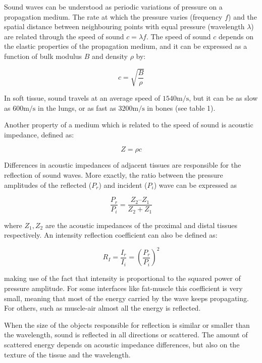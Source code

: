 \documentclass[12pt]{article} %
\begin{document}
	
	Sound waves can be understood as periodic variations of pressure on a propagation medium. The rate at which the pressure varies (frequency $f$) and the spatial distance between neighbouring points with equal pressure (wavelength $\lambda$) are related through the speed of sound $c = \lambda f$. The speed of sound $c$ depends on the elastic properties of the propagation medium, and it can be expressed as a function of bulk modulus $B$ and density $\rho$ by:
	
	\[  c = \sqrt{ \frac{B}{\rho} } \]
	
	In soft tissue, sound travels at an average speed of $ 1540 \si{\meter\per\second} $, but it can be as slow as $ 600 \si{\meter\per\second} $ in the lungs, or as fast as $ 3200 \si{\meter\per\second} $ in bones (see table 1). 
	
	
	Another property of a medium which is related to the speed of sound is acoustic impedance, defined as: 	
	
	\[ Z = \rho c \]
	 	
	Differences in acoustic impedances of adjacent tissues are responsible for the reflection of sound waves. More exactly, the ratio between the pressure amplitudes of the reflected ($P_r$) and incident ($P_i$) wave can be expressed as	
	
	\[ \frac{P_r}{P_i} = \frac{Z_2 – Z_1}{Z_2 + Z_1} \]	
	
	where $Z_1, Z_2$ are the acoustic impedances of the proximal and distal tissues respectively. An intensity reflection coefficient can also be defined as: 	
	
	\[ R_I = \frac{I_r}{I_i} = \left( \frac{P_r}{P_i} \right)^2 \]	
	
	making use of the fact that intensity is proportional to the squared power of pressure amplitude. For some interfaces like fat-muscle this coefficient is very small, meaning that most of the energy carried by the wave keeps propagating. For others, such as muscle-air almost all the energy is reflected.

	
	When the size of the objects responsible for reflection is similar or smaller than the wavelength, sound is reflected in all directions or scattered. The amount of scattered energy depends on acoustic impedance differences, but also on the texture of the tissue and the wavelength.
\end{document}
